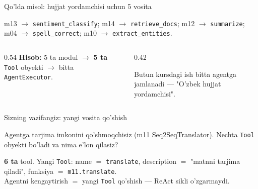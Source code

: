\documentclass[aspectratio=169,11pt]{beamer}
\begin{document}
\begin{frame}{Qo'lda misol: hujjat yordamchisi uchun 5 vosita}
  \begin{tcolorbox}[defbox,title={Kapstone modullari -> agent vositalari}]
    \footnotesize
    m13 $\to$ \texttt{sentiment\_classify}; \; m14 $\to$ \texttt{retrieve\_docs}; \;
    m12 $\to$ \texttt{summarize}; \; m04 $\to$ \texttt{spell\_correct}; \;
    m10 $\to$ \texttt{extract\_entities}.
  \end{tcolorbox}
  \vspace{0.2em}
  \begin{columns}[T]
    \begin{column}{0.54\textwidth}
      \textbf{Hisob:} 5 ta modul $\to$ \textbf{5 ta} \texttt{Tool} obyekti $\to$
      bitta \texttt{AgentExecutor}.
    \end{column}
    \begin{column}{0.42\textwidth}
      \begin{tcolorbox}[okbox,top=2pt,bottom=2pt]
        \footnotesize
        Butun kursdagi ish bitta agentga jamlanadi --- "O'zbek hujjat yordamchisi".
      \end{tcolorbox}
    \end{column}
  \end{columns}
\end{frame}

\begin{frame}{Sizning vazifangiz: yangi vosita qo'shish}
  \begin{tcolorbox}[warnbox,title=Savol --- 60 soniya]
    \small
    Agentga tarjima imkonini qo'shmoqchisiz (m11 Seq2SeqTranslator). Nechta
    \texttt{Tool} obyekti bo'ladi va nima e'lon qilasiz?
  \end{tcolorbox}
  \pause
  \begin{tcolorbox}[okbox,title=Javob]
    \small
    \textbf{6 ta} tool. Yangi \texttt{Tool}: name $=$ \texttt{translate},
    description $=$ "matnni tarjima qiladi", funksiya $=$ \texttt{m11.translate}.\\[3pt]
    \footnotesize Agentni kengaytirish $=$ yangi \texttt{Tool} qo'shish ---
    ReAct sikli o'zgarmaydi.
  \end{tcolorbox}
\end{frame}
\end{document}
